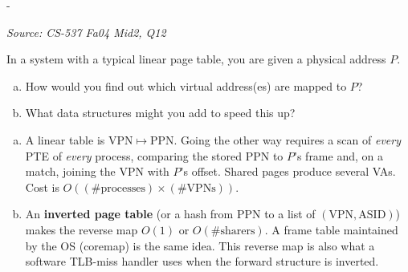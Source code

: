 \documentclass[11pt,a4paper]{article}
\makeatletter
\newcommand{\keepspace}[1]{\par\penalty-100\begingroup
  \setlength{\dimen@}{#1}\dimen@ii\pagegoal\advance\dimen@ii-\pagetotal
  \ifdim\dimen@>\dimen@ii\ifdim\dimen@ii>\z@\vfil\fi\break\fi\endgroup}
\newcounter{qn}[section]
\newenvironment{Qn}[4]{%
  \refstepcounter{qn}\keepspace{7\baselineskip}%
  \begin{tcolorbox}[qboxstyle, title={Q\thesection.\theqn\ \ [#1 \textbar\ #2]\ \ #4}]%
  {\footnotesize\color{g3}\textit{Source: #3}}\par\smallskip%
}{%
  \end{tcolorbox}%
}
\newenvironment{Sol}{%
  \begin{tcolorbox}[sboxstyle, title={Solution}]%
}{%
  \end{tcolorbox}\vspace{0.35em}%
}
\makeatother
\begin{document}
\begin{Qn}{Medium-Hard}{Lect 14}{CS-537 Fa04 Mid2, Q12}{Reverse translation: which VPN maps to physical address $P$?}
In a system with a typical linear page table, you are given a physical
address $P$.
\begin{enumerate}[(a)]
\item How would you find out which virtual address(es) are mapped to $P$?
\item What data structures might you add to speed this up?
\end{enumerate}
\end{Qn}
\begin{Sol}
\begin{enumerate}[(a)]
\item A linear table is $\mathrm{VPN}\mapsto\mathrm{PPN}$. Going the other
      way requires a scan of \emph{every} PTE of \emph{every} process,
      comparing the stored PPN to $P$'s frame and, on a match, joining
      the VPN with $P$'s offset. Shared pages produce several VAs.
      Cost is $O((\textrm{\#processes})\times(\textrm{\#VPNs}))$.
\item An \textbf{inverted page table} (or a hash from PPN to a list of
      $(\mathrm{VPN},\mathrm{ASID})$) makes the reverse map $O(1)$ or
      $O(\textrm{\#sharers})$. A frame table maintained by the OS
      (coremap) is the same idea. This reverse map is also what a
      software TLB-miss handler uses when the forward structure is
      inverted.
\end{enumerate}
\end{Sol}
\end{document}
